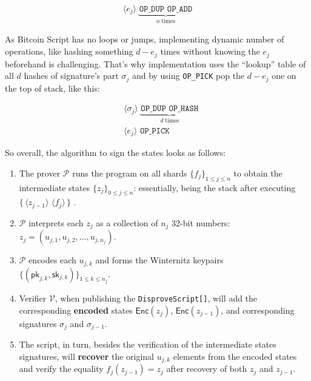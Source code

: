 \documentclass{iacrtrans}
\newcommand{\elem}[1]{\, \langle #1 \rangle \,}
\newcommand{\opcode}[1]{\, \texttt{#1} \,}
\newcommand{\script}[1]{ $\big\{ #1 \big\}$ }
\begin{document}
\begin{empheqboxed}
  \begin{align*}
    \elem{e_j} \underbrace{\opcode{OP\_DUP} \opcode{OP\_ADD}}_{n \; \text{times}}
  \end{align*}
\end{empheqboxed}

As Bitcoin Script has no loops or jumps, implementing dynamic number of
operations, like hashing something $d - e_j$ times without knowing the $e_j$
beforehand is challenging. That's why implementation uses the ``lookup'' table
of all $d$ hashes of signature's part $\sigma_j$ and by using \texttt{OP\_PICK}
pop the $d - e_j$ one on the top of stack, like this:

\begin{empheqboxed}
  \begin{align*}
    & \elem{\sigma_j} \underbrace{\opcode{OP\_DUP}
    \opcode{OP\_HASH}}_{d \; \text{times}} \\
    & \elem{e_j} \opcode{OP\_PICK}
  \end{align*}
\end{empheqboxed}

So overall, the algorithm to sign the states looks as follows:
\begin{enumerate}
  \item The prover $\mathcal{P}$ runs the program on all shards $\{f_j\}_{1 \leq
  j \leq n}$ to obtain the intermediate states $\{z_j\}_{0 \leq j \leq n}$:
  essentially, being the stack after executing \script{\elem{z_{j-1}}
  \elem{f_j}}.
  \item $\mathcal{P}$ interprets each $z_j$ as a collection of $n_j$ 32-bit
  numbers: $z_j = (u_{j,1}, u_{j,2}, \dots, u_{j, n_j})$.
  \item $\mathcal{P}$ encodes each $u_{j,k}$ and forms the Winternitz keypairs
  $\{(\mathsf{pk}_{j,k},\mathsf{sk}_{j,k})\}_{1 \leq k \leq n_j}$.
  \item Verifier $\mathcal{V}$, when publishing the
  \texttt{DisproveScript[]}, will add the corresponding
  \textbf{encoded} states $\mathsf{Enc}(z_j)$, $\mathsf{Enc}(z_{j-1})$, and
  corresponding signatures $\sigma_j$ and $\sigma_{j-1}$. 
  \item The script, in turn, besides the verification of the intermediate states
  signatures, will \textbf{recover} the original $u_{j,k}$ elements from the
  encoded states and verify the equality $f_j(z_{j-1}) = z_j$ after recovery of
  both $z_j$ and $z_{j-1}$.
\end{enumerate}
\end{document}
